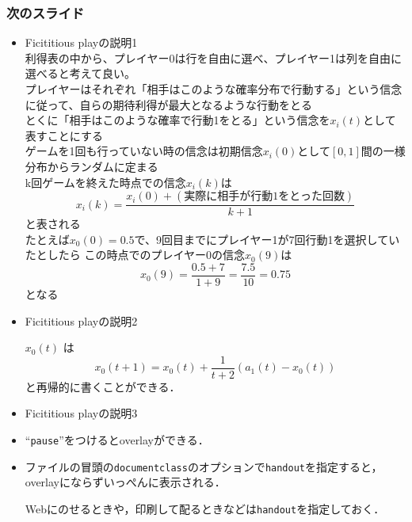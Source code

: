 \documentclass[dvipdfmx,fleqn]{beamer}
\begin{document}
\begin{frame}
\frametitle{次のスライド}
\begin{itemize}\setlength{\parskip}{0.5em}
\item
Ficititious playの説明1\\
利得表の中から、プレイヤー0は行を自由に選べ、プレイヤー1は列を自由に選べると考えて良い。\\
プレイヤーはそれぞれ「相手はこのような確率分布で行動する」という信念に従って、自らの期待利得が最大となるような行動をとる\\
とくに「相手はこのような確率で行動1をとる」という信念を$x_i(t)$として表すことにする\\
ゲームを1回も行っていない時の信念は初期信念$x_i(0)$として$[0,1]$間の一様分布からランダムに定まる\\
k回ゲームを終えた時点での信念$x_i(k)$は
\begin{equation*}
x_i(k)=\frac{x_i(0)+(\mbox{実際に相手が行動1をとった回数})}{k+1}
\end{equation*}
と表される\\
たとえば$x_0(0)=0.5$で、9回目までにプレイヤー1が7回行動1を選択していたとしたら
この時点でのプレイヤー0の信念$x_0(9)$は
\begin{equation*}
x_0(9)=\frac{0.5+7}{1+9}=\frac{7.5}{10}=0.75
\end{equation*}
となる
\item
Ficititious playの説明2 \pause

$x_0(t)$ は
\[
x_0(t+1)
= x_0(t) + \frac{1}{t+2} (a_1(t) - x_0(t))
\]
と再帰的に書くことができる． \pause

\item
Ficititious playの説明3 \pause

\item
``\texttt{pause}''をつけるとoverlayができる．

\item
ファイルの冒頭の\texttt{documentclass}のオプションで\texttt{handout}を指定すると，
overlayにならずいっぺんに表示される．

Webにのせるときや，印刷して配るときなどは\texttt{handout}を指定しておく．

\end{itemize}
\end{frame}
\end{document}
